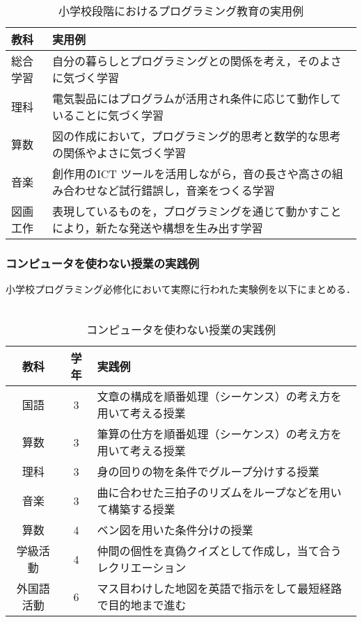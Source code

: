 \begin{table}[htb]
    \caption{小学校段階におけるプログラミング教育の実用例}
  \begin{tabularx}{\linewidth}{|X|X|} \hline
    教科& 実用例 \\ \hline
    総合学習& 自分の暮らしとプログラミングとの関係を考え，そのよさに気づく学習 \\ \hline
    理科&電気製品にはプログラムが活用され条件に応じて動作していることに気づく学習\\ \hline
    算数 & 図の作成において，プログラミング的思考と数学的な思考の関係やよさに気づく学習\\ \hline
    音楽 & 創作用のICT ツールを活用しながら，音の長さや高さの組み合わせなど試行錯誤し，音楽をつくる学習\\ \hline
    図画工作 & 表現しているものを，プログラミングを通じて動かすことにより，新たな発送や構想を生み出す学習\\ \hline
   
  \end{tabularx}

  \end{table}
\newpage


\subsubsection{コンピュータを使わない授業の実践例}
小学校プログラミング必修化において実際に行われた実験例\cite{con}を以下にまとめる．\\
\\
\begin{table}[htb]
\begin{center}
\centering
    \caption{コンピュータを使わない授業の実践例}
  \begin{tabular}{|c|c|l|} \hline
    教科& 学年&実践例 \\ \hline
    国語& 3&文章の構成を順番処理（シーケンス）の考え方を用いて考える授業\\ \hline
    算数& 3&筆算の仕方を順番処理（シーケンス）の考え方を用いて考える授業\\ \hline
    理科& 3&身の回りの物を条件でグループ分けする授業\\ \hline
    音楽& 3&曲に合わせた三拍子のリズムをループなどを用いて構築する授業\\ \hline
    算数& 4&ベン図を用いた条件分けの授業\\ \hline
    学級活動& 4&仲間の個性を真偽クイズとして作成し，当て合うレクリエーション\\ \hline
    外国語活動& 6&マス目わけした地図を英語で指示をして最短経路で目的地まで進む\\ \hline
   
  \end{tabular}
  \label{tab:bamen1}
  \end{center}
\end{table}

